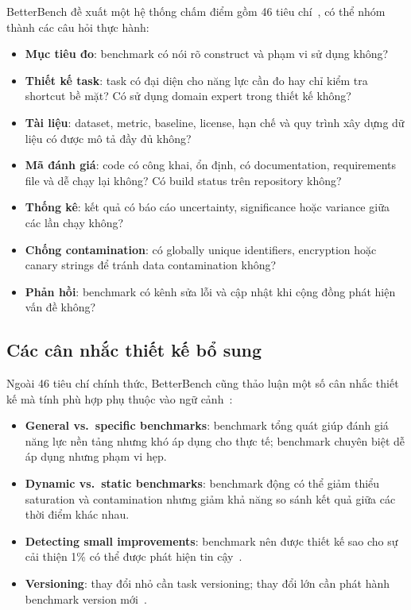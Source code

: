 BetterBench đề xuất một hệ thống chấm điểm gồm 46 tiêu chí~\cite{betterbench}, có thể nhóm thành các câu hỏi thực hành:

\begin{itemize}
    \item \textbf{Mục tiêu đo}: benchmark có nói rõ construct và phạm vi sử dụng không?
    \item \textbf{Thiết kế task}: task có đại diện cho năng lực cần đo hay chỉ kiểm tra shortcut bề mặt? Có sử dụng domain expert trong thiết kế không?
    \item \textbf{Tài liệu}: dataset, metric, baseline, license, hạn chế và quy trình xây dựng dữ liệu có được mô tả đầy đủ không?
    \item \textbf{Mã đánh giá}: code có công khai, ổn định, có documentation, requirements file và dễ chạy lại không? Có build status trên repository không?
    \item \textbf{Thống kê}: kết quả có báo cáo uncertainty, significance hoặc variance giữa các lần chạy không?
    \item \textbf{Chống contamination}: có globally unique identifiers, encryption hoặc canary strings để tránh data contamination không?
    \item \textbf{Phản hồi}: benchmark có kênh sửa lỗi và cập nhật khi cộng đồng phát hiện vấn đề không?
\end{itemize}

\subsection{Các cân nhắc thiết kế bổ sung}

Ngoài 46 tiêu chí chính thức, BetterBench cũng thảo luận một số cân nhắc thiết kế mà tính phù hợp phụ thuộc vào ngữ cảnh~\cite{betterbench}:

\begin{itemize}
    \item \textbf{General vs.\ specific benchmarks}: benchmark tổng quát giúp đánh giá năng lực nền tảng nhưng khó áp dụng cho thực tế; benchmark chuyên biệt dễ áp dụng nhưng phạm vi hẹp.
    \item \textbf{Dynamic vs.\ static benchmarks}: benchmark động có thể giảm thiểu saturation và contamination nhưng giảm khả năng so sánh kết quả giữa các thời điểm khác nhau.
    \item \textbf{Detecting small improvements}: benchmark nên được thiết kế sao cho sự cải thiện 1\% có thể được phát hiện tin cậy~\cite{betterbench}.
    \item \textbf{Versioning}: thay đổi nhỏ cần task versioning; thay đổi lớn cần phát hành benchmark version mới~\cite{betterbench}.
\end{itemize}

